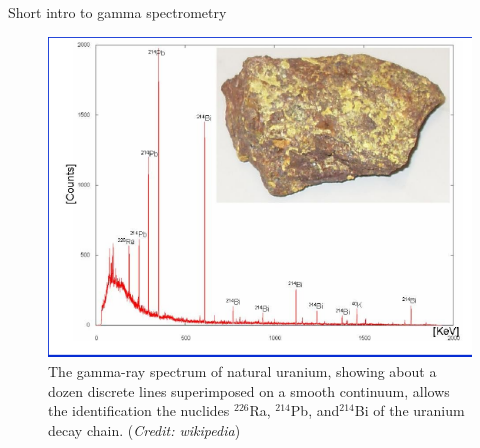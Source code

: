 \begin{frame}{Short intro to gamma spectrometry}


\begin{figure}
\centering
\includegraphics[scale=0.4]{figures/pechblenda.png}
\caption*{The gamma-ray spectrum of natural uranium, showing about a dozen discrete lines superimposed on a smooth continuum, allows the identification the nuclides $^{226}$Ra, $^{214}$Pb, and$^{214}$Bi of the uranium decay chain. (\emph{Credit: wikipedia})}
\end{figure}


\end{frame}

